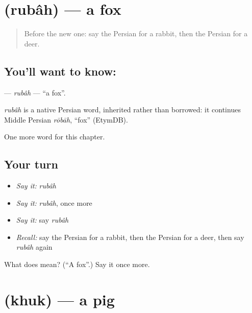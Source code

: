 \section[\texorpdfstring{\fa{روباه} (rubâh)}{روباه (rubâh)}]{ (rubâh) — a fox}

\label{lesson:FA-C105-rubah}



\begin{quote}
Before the new one: say the Persian for a rabbit, then the Persian for a deer.
\end{quote}

\subsection*{You'll want to know: }
\textbf{} — \emph{rubâh} — \textquotedblleft{}a fox\textquotedblright{}.

\begin{cousinweb}
\emph{rubâh} is a native Persian word, inherited rather than borrowed: it continues Middle Persian \emph{rōbāh}, \textquotedblleft{}fox\textquotedblright{} (EtymDB).
\end{cousinweb}

\begin{grammarlens}[title={What you've built}]
One more word for this chapter.
\end{grammarlens}

\subsection*{Your turn}
\begin{itemize}
\raggedright
  \item \emph{Say it:} \emph{rubâh}
  \item \emph{Say it:} \emph{rubâh}, once more
  \item \emph{Say it:} say \emph{rubâh}
  \item \emph{Recall:} say the Persian for a rabbit, then the Persian for a deer, then say \emph{rubâh} again
\end{itemize}

\begin{tcolorbox}[breakable,colback=teal!4,colframe=teal!35!black,title={Before you move on}]
What does  mean? (\textquotedblleft{}A fox\textquotedblright{}.) Say it once more.
\end{tcolorbox}
\section[\texorpdfstring{\fa{خوک} (khuk)}{خوک (khuk)}]{ (khuk) — a pig}

